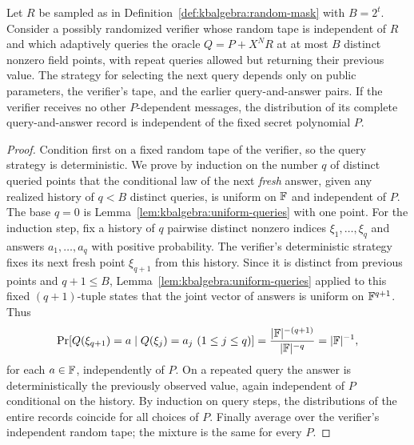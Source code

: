 \begin{theorem}\label{thm:kbalgebra:adaptive-queries}
Let $R$ be sampled as in Definition~\ref{def:kbalgebra:random-mask} with $B=2^t$. Consider a possibly randomized verifier whose random tape is independent of $R$ and which adaptively queries the oracle $Q=P+X^N R$ at at most $B$ distinct nonzero field points, with repeat queries allowed but returning their previous value. The strategy for selecting the next query depends only on public parameters, the verifier's tape, and the earlier query-and-answer pairs. If the verifier receives no other $P$-dependent messages, the distribution of its complete query-and-answer record is independent of the fixed secret polynomial $P$.
\end{theorem}
\begin{proof}
Condition first on a fixed random tape of the verifier, so the query strategy is deterministic. We prove by induction on the number $q$ of distinct queried points that the conditional law of the next \emph{fresh} answer, given any realized history of $q<B$ distinct queries, is uniform on $\mathbb{F}$ and independent of $P$. The base $q=0$ is Lemma~\ref{lem:kbalgebra:uniform-queries} with one point. For the induction step, fix a history of $q$ pairwise distinct nonzero indices $\xi_1,\ldots,\xi_q$ and answers $a_1,\ldots,a_q$ with positive probability. The verifier's deterministic strategy fixes its next fresh point $\xi_{q+1}$ from this history. Since it is distinct from previous points and $q+1\leq B$, Lemma~\ref{lem:kbalgebra:uniform-queries} applied to this fixed $(q+1)$-tuple states that the joint vector of answers is uniform on $\mathbb{F}^{q+1}$. Thus
\[
 \Pr[Q(\xi_{q+1})=a\mid Q(\xi_j)=a_j\ (1\leq j\leq q)]
 =\frac{|\mathbb{F}|^{-(q+1)}}{|\mathbb{F}|^{-q}}=|\mathbb{F}|^{-1},
\]
for each $a\in\mathbb{F}$, independently of $P$. On a repeated query the answer is deterministically the previously observed value, again independent of $P$ conditional on the history. By induction on query steps, the distributions of the entire records coincide for all choices of $P$. Finally average over the verifier's independent random tape; the mixture is the same for every $P$.
\end{proof}

